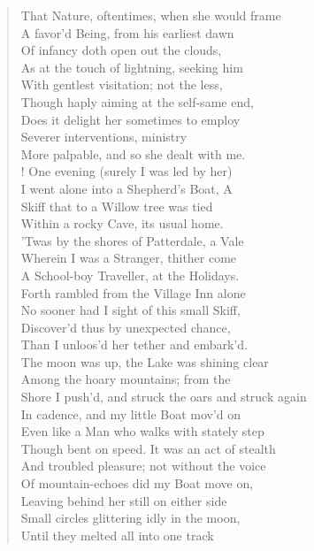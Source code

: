 \begin{verse}
That Nature, oftentimes, when she would frame  \\
A favor'd Being, from his earliest dawn  \\
Of infancy doth open out the clouds,  \\
As at the touch of lightning, seeking him  \\
With gentlest visitation; not the less,	  \\
Though haply aiming at the self-same end,  \\
Does it delight her sometimes to employ  \\
Severer interventions, ministry  \\
More palpable, and so she dealt with me.  \\!
One evening (surely I was led by her)	  \\
I went alone into a Shepherd's Boat, A  \\
Skiff that to a Willow tree was tied  \\
Within a rocky Cave, its usual home.  \\
'Twas by the shores of Patterdale, a Vale  \\
Wherein I was a Stranger, thither come	  \\
A School-boy Traveller, at the Holidays.  \\
Forth rambled from the Village Inn alone  \\
No sooner had I sight of this small Skiff,  \\
Discover'd thus by unexpected chance,  \\
Than I unloos'd her tether and embark'd.	  \\
The moon was up, the Lake was shining clear  \\
Among the hoary mountains; from the  \\
Shore I push'd, and struck the oars and struck again  \\
In cadence, and my little Boat mov'd on  \\
Even like a Man who walks with stately step	  \\
Though bent on speed. It was an act of stealth  \\
And troubled pleasure; not without the voice  \\
Of mountain-echoes did my Boat move on,  \\
Leaving behind her still on either side  \\
Small circles glittering idly in the moon,	  \\
Until they melted all into one track  \\

\end{verse}
